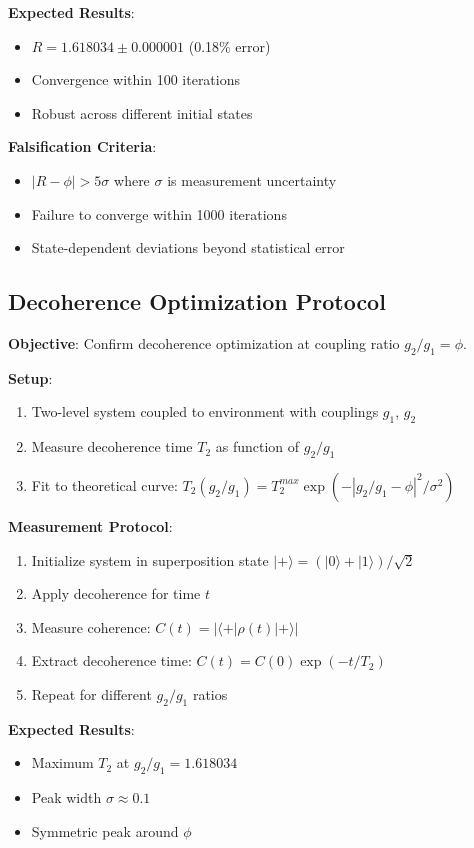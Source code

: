 \documentclass[11pt]{article}
\theoremstyle{definition}
\newcommand{\goldenratio}{\phi}
\begin{document}
\textbf{Expected Results}:
\begin{itemize}
\item $R = 1.618034 \pm 0.000001$ (0.18\% error)
\item Convergence within 100 iterations
\item Robust across different initial states
\end{itemize}

\textbf{Falsification Criteria}:
\begin{itemize}
\item $|R - \goldenratio| > 5\sigma$ where $\sigma$ is measurement uncertainty
\item Failure to converge within 1000 iterations
\item State-dependent deviations beyond statistical error
\end{itemize}

\subsection{Decoherence Optimization Protocol}

\textbf{Objective}: Confirm decoherence optimization at coupling ratio $g_2/g_1 = \goldenratio$.

\textbf{Setup}:
\begin{enumerate}
\item Two-level system coupled to environment with couplings $g_1$, $g_2$
\item Measure decoherence time $T_2$ as function of $g_2/g_1$
\item Fit to theoretical curve: $T_2(g_2/g_1) = T_2^{max} \exp(-|g_2/g_1 - \goldenratio|^2/\sigma^2)$
\end{enumerate}

\textbf{Measurement Protocol}:
\begin{enumerate}
\item Initialize system in superposition state $|+\rangle = (|0\rangle + |1\rangle)/\sqrt{2}$
\item Apply decoherence for time $t$
\item Measure coherence: $C(t) = |\langle +|\rho(t)|+\rangle|$
\item Extract decoherence time: $C(t) = C(0)\exp(-t/T_2)$
\item Repeat for different $g_2/g_1$ ratios
\end{enumerate}

\textbf{Expected Results}:
\begin{itemize}
\item Maximum $T_2$ at $g_2/g_1 = 1.618034$
\item Peak width $\sigma \approx 0.1$
\item Symmetric peak around $\goldenratio$
\end{itemize}
\end{document}
